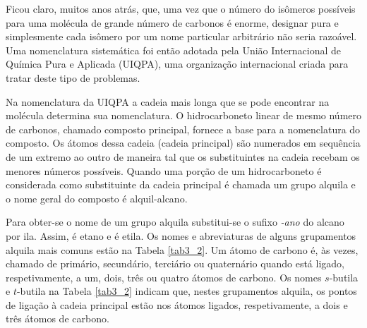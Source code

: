 \begin{tightcenter}
    \qquad
    \qquad
    \chemnameinit{}
\end{tightcenter}

Ficou claro, muitos anos atrás, que, uma vez que o número do isômeros possíveis para uma molécula de grande número de carbonos é enorme, designar pura e simplesmente cada isômero por um nome particular arbitrário não seria razoável. Uma nomenclatura sistemática foi então adotada pela União Internacional de Química Pura e Aplicada (UIQPA), uma organização internacional criada para tratar deste tipo de problemas.

Na nomenclatura da UIQPA a cadeia mais longa que se pode encontrar na molécula determina sua nomenclatura. O hidrocarboneto linear de mesmo número de carbonos, chamado composto principal, fornece a base para a nomenclatura do composto. Os átomos dessa cadeia (cadeia principal) são numerados em sequência de um extremo ao outro de maneira tal que os substituintes na cadeia recebam os menores números possíveis. Quando uma porção de um hidrocarboneto é considerada como substituinte da cadeia principal é chamada um grupo alquila e o nome geral do composto é alquil-alcano.

Para obter-se o nome de um grupo alquila substitui-se o sufixo \textit{-ano} do alcano por ila. Assim,  é etano e  é etila. Os nomes e abreviaturas de alguns grupamentos alquila mais comuns estão na Tabela \ref{tab3_2}. Um átomo de carbono é, às vezes, chamado de primário, secundário, terciário ou quaternário quando está ligado, respetivamente, a um, dois, três ou quatro átomos de carbono. Os nomes $s$-butila e $t$-butila na Tabela \ref{tab3_2} indicam que, nestes grupamentos alquila, os pontos de ligação à cadeia principal estão nos átomos ligados, respetivamente, a dois e três átomos de carbono.

